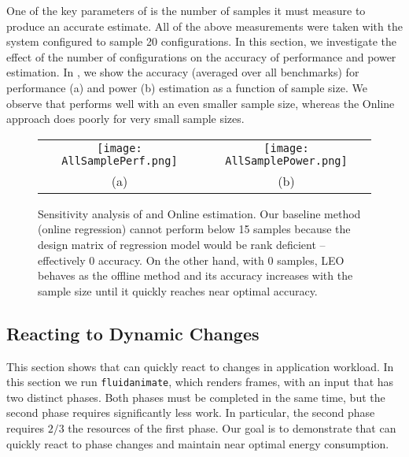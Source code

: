 One of the key parameters of \SYSTEM{} is the number of samples it must
measure to produce an accurate estimate.  All of the above
measurements were taken with the system configured to sample 20
configurations.  In this section, we investigate the effect of the
number of configurations on the accuracy of performance and power
estimation. In , we show the accuracy
(averaged over all benchmarks) for performance (a) and power (b)
estimation as a function of sample size. We observe that \SYSTEM{}
performs well with an even smaller sample size, whereas the Online
approach does poorly for very small sample sizes.
\begin{figure}
\begin{center}
\begin{tabular}[h]{cc}\hspace*{-15pt}     
	 \texttt{[image: AllSamplePerf.png]}& 
	\texttt{[image: AllSamplePower.png]}\\
	 {(a)} &
	 {(b)}
\end{tabular}
\end{center}
\vspace{-1.25em}
\caption{Sensitivity analysis of \SYSTEM{} and Online estimation. Our
  baseline method (online regression) cannot perform below 15 samples
  because the design matrix of regression model would be rank
  deficient -- effectively 0 accuracy. On the other hand, with 0
  samples, LEO behaves as the offline method and its accuracy
  increases with the sample size until it quickly reaches near optimal
  accuracy. }
\label{fig:Sensitivity}
\end{figure}



\subsection{Reacting to Dynamic Changes}
\label{sec:controller}



This section shows that \SYSTEM{} can quickly react to changes in
application workload.  In this section we run \texttt{fluidanimate},
which renders frames, with an input that has two distinct phases.
Both phases must be completed in the same time, but the second phase
requires significantly less work.  In particular, the second phase
requires $2/3$ the resources of the first phase.  Our goal is to
demonstrate that \SYSTEM{} can quickly react to phase changes and
maintain near optimal energy consumption.  

